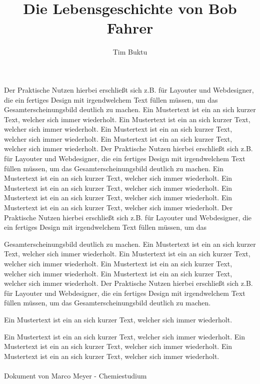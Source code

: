 \documentclass{article}
\title{Die Lebensgeschichte von Bob Fahrer}
\author{Tim Buktu}
\begin{document}
\maketitle

Der Praktische Nutzen hierbei erschließt sich z.B. für Layouter und Webdesigner, die ein fertiges Design mit irgendwelchem Text füllen müssen, um das Gesamterscheinungsbild deutlich zu machen. Ein Mustertext ist ein an sich kurzer Text, welcher sich immer wiederholt. Ein Mustertext ist ein an sich kurzer Text, welcher sich immer wiederholt. Ein
Mustertext ist ein an sich kurzer Text, welcher sich immer wiederholt. Ein Mustertext ist ein an sich kurzer Text, welcher sich immer wiederholt. Der Praktische Nutzen hierbei erschließt sich z.B. für Layouter und Webdesigner, die ein fertiges Design mit irgendwelchem Text füllen müssen, um das Gesamterscheinungsbild deutlich zu machen. Ein Mustertext ist ein an sich kurzer Text, welcher sich immer wiederholt. Ein Mustertext ist ein an sich kurzer Text, welcher sich immer wiederholt. Ein Mustertext ist ein an sich kurzer Text, welcher sich immer wiederholt. Ein Mustertext ist ein an sich kurzer Text, welcher sich immer wiederholt. \cite{stix2010}
Der Praktische Nutzen hierbei erschließt sich z.B. für Layouter und Webdesigner, die ein fertiges Design mit irgendwelchem Text füllen müssen, um das

Gesamterscheinungsbild deutlich zu machen. Ein Mustertext ist ein an sich kurzer Text, welcher sich immer wiederholt. Ein Mustertext ist ein an sich kurzer Text, welcher sich immer wiederholt. Ein Mustertext ist ein an sich kurzer Text, welcher sich immer wiederholt. Ein Mustertext ist ein an sich kurzer Text, welcher sich immer wiederholt. Der Praktische Nutzen hierbei erschließt sich z.B. für Layouter und Webdesigner, die ein fertiges Design mit irgendwelchem Text füllen müssen, um das Gesamterscheinungsbild deutlich zu machen.

\begin{center}
    Ein Mustertext
    ist ein an
    sich kurzer
    Text,
    welcher
	sich immer wiederholt. \cite{buhring2009}
\end{center}
Ein Mustertext ist ein an sich kurzer Text, welcher sich immer wiederholt. Ein Mustertext ist ein an sich kurzer Text, welcher sich immer wiederholt. Ein Mustertext ist ein an sich kurzer Text, welcher sich immer wiederholt. \cite{karl2005}
\\
\\
Dokument von Marco Meyer - Chemiestudium



\end{document}
